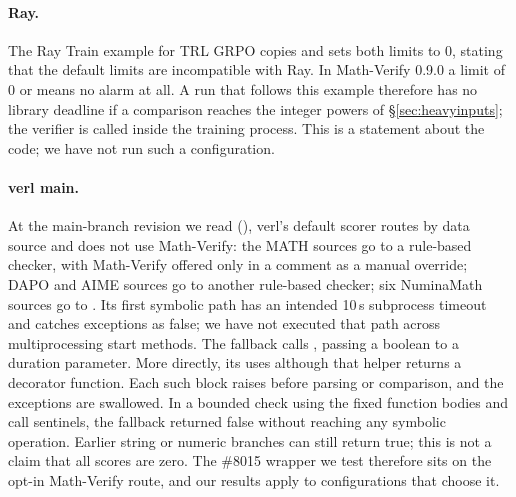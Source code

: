 \documentclass[11pt,a4paper]{article}
\newcommand{\pr}[1]{\#{#1}}
\begin{document}
\paragraph{Ray.} The Ray Train example for TRL GRPO \cite{rayexample} copies  and sets both limits to 0, stating that the default limits are incompatible with Ray. In Math-Verify 0.9.0 a limit of 0 or  means no alarm at all. A run that follows this example therefore has no library deadline if a comparison reaches the integer powers of \S\ref{sec:heavyinputs}; the verifier is called inside the training process. This is a statement about the code; we have not run such a configuration.

\paragraph{verl main.} At the main-branch revision we read (), verl's default scorer \cite{verlrouting} routes by data source and does not use Math-Verify: the MATH sources go to a rule-based checker, with Math-Verify offered only in a comment as a manual override; DAPO and AIME sources go to another rule-based checker; six NuminaMath sources go to . Its first symbolic path has an intended 10\,s subprocess timeout and catches exceptions as false; we have not executed that path across multiprocessing start methods. The fallback calls , passing a boolean to a duration parameter. More directly, its  uses  although that helper returns a decorator function. Each such block raises  before parsing or comparison, and the exceptions are swallowed. In a bounded check using the fixed function bodies and call sentinels, the fallback returned false without reaching any symbolic operation. Earlier string or numeric branches can still return true; this is not a claim that all  scores are zero. The \pr{8015} wrapper we test therefore sits on the opt-in Math-Verify route, and our results apply to configurations that choose it.
\end{document}
